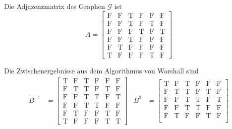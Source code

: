 \documentclass[a4paper,11pt]{article}             %
\begin{document}
\setcounter{excnt}{7}
\begin{ex}
\begin{exlist}
  \leavevmode
  \item Die Adjazenzmatrix des Graphen $\mathcal{G}$ ist
    \begin{equation*}
A= \begin{bmatrix}                
      \text{F} & \text{F} & \text{T} &  \text{F} & \text{F} & \text{F} \\
      \text{F} & \text{F} & \text{T} &  \text{F} & \text{T} &  \text{F} \\
      \text{F} & \text{F} & \text{F} & \text{T} &  \text{F} & \text{T} \\
      \text{F} & \text{F} & \text{T} &  \text{F} & \text{F} & \text{F} \\
      \text{F} & \text{T} &  \text{F} & \text{F} & \text{F} & \text{F} \\
      \text{T} &  \text{F} & \text{F} & \text{F} & \text{T} &  \text{F}
\end{bmatrix}
    \end{equation*}
  \item Die Zwischenergebnisse aus dem Algorithmus von Warshall sind
    \begin{align*}
B^{-1} &=
\begin{bmatrix}
\text{T} & \text{F} & \text{T} & \text{F} & \text{F} & \text{F}  \\
\text{F} & \text{T} & \text{T} & \text{F} & \text{T} & \text{F}  \\
\text{F} & \text{F} & \text{T} & \text{T} & \text{F} & \text{T}  \\
\text{F} & \text{F} & \text{T} & \text{T} & \text{F} & \text{F}  \\
\text{F} & \text{T} & \text{F} & \text{F} & \text{T} & \text{F}  \\
\text{T} & \text{F} & \text{F} & \text{F} & \text{T} & \text{T} 
\end{bmatrix}
& B^{0} &=
\begin{bmatrix}
\text{T} & \text{F} & \text{T} & \text{F} & \text{F} & \text{F}  \\
\text{F} & \text{T} & \text{T} & \text{F} & \text{T} & \text{F}  \\
\text{F} & \text{F} & \text{T} & \text{T} & \text{F} & \text{T}  \\
\text{F} & \text{F} & \text{T} & \text{T} & \text{F} & \text{F}  \\
\text{F} & \text{T} & \text{F} & \text{F} & \text{T} & \text{F}  \\

\end{bmatrix}
\end{align*}
\end{exlist}
\end{ex}
\end{document}

